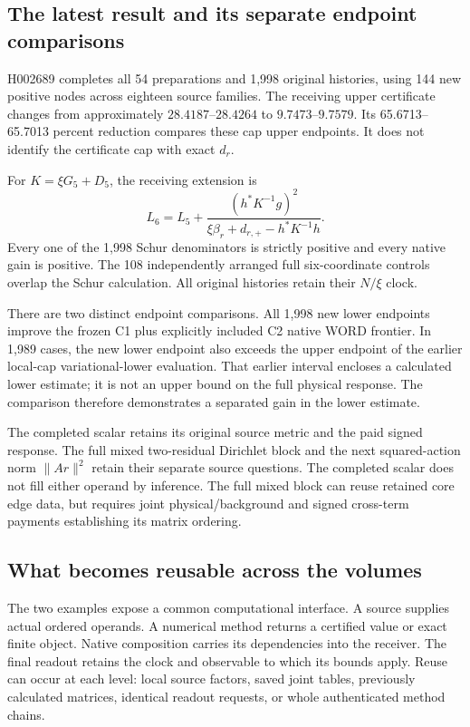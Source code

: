 \subsection{The latest result and its separate endpoint comparisons}

H002689 completes all 54 preparations and 1,998 original histories, using 144 new positive nodes across eighteen source families. The receiving upper certificate changes from approximately $28.4187$--$28.4264$ to $9.7473$--$9.7579$. Its 65.6713--65.7013 percent reduction compares these cap upper endpoints. It does not identify the certificate cap with exact $d_r$.

For $K=\xi G_5+D_5$, the receiving extension is
\begin{equation}
 L_6=L_5+\frac{(h^*K^{-1}g)^2}
 {\xi\beta_r+d_{r,+}-h^*K^{-1}h}.
\end{equation}
Every one of the 1,998 Schur denominators is strictly positive and every native gain is positive. The 108 independently arranged full six-coordinate controls overlap the Schur calculation. All original histories retain their $N/\xi$ clock.

There are two distinct endpoint comparisons. All 1,998 new lower endpoints improve the frozen C1 plus explicitly included C2 native WORD frontier. In 1,989 cases, the new lower endpoint also exceeds the upper endpoint of the earlier local-cap variational-lower evaluation. That earlier interval encloses a calculated lower estimate; it is not an upper bound on the full physical response. The comparison therefore demonstrates a separated gain in the lower estimate.

The completed scalar retains its original source metric and the paid signed response. The full mixed two-residual Dirichlet block and the next squared-action norm $\|Ar\|^2$ retain their separate source questions. The completed scalar does not fill either operand by inference. The full mixed block can reuse retained core edge data, but requires joint physical/background and signed cross-term payments establishing its matrix ordering.

\subsection{What becomes reusable across the volumes}

The two examples expose a common computational interface. A source supplies actual ordered operands. A numerical method returns a certified value or exact finite object. Native composition carries its dependencies into the receiver. The final readout retains the clock and observable to which its bounds apply. Reuse can occur at each level: local source factors, saved joint tables, previously calculated matrices, identical readout requests, or whole authenticated method chains.

